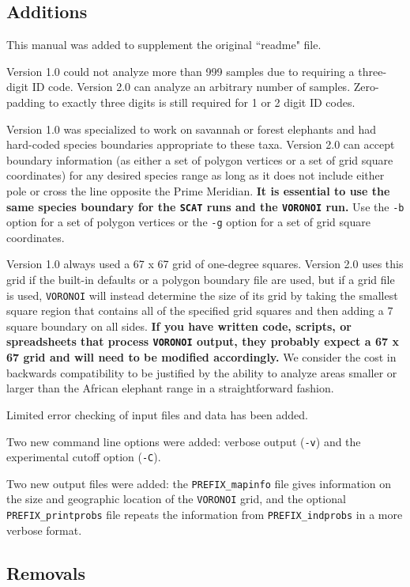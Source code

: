 \documentclass[10pt,titlepage,times,letterpaper]{article}
\def\SCAT{{\tt SCAT} }
\def\VORONOI{{\tt VORONOI} }
\begin{document}
\subsection{Additions}

This manual was added to supplement the original ``readme" file.

Version 1.0 could not analyze more than 999 samples due to requiring a three-digit
ID code.  Version 2.0 can analyze an arbitrary number of samples.  Zero-padding 
to exactly three digits is still required for 1 or 2 digit ID codes.

Version 1.0 was specialized to work on savannah or forest elephants and had hard-coded
species boundaries appropriate to these taxa.  Version 2.0 can accept boundary information
(as either a set of polygon vertices or a set of grid square coordinates) for
any desired species range as long as it does not include either pole or cross the line
opposite the Prime Meridian.
{\bf It is essential to use the same species boundary for the \SCAT runs and the \VORONOI run.}
Use the {\tt -b} option for a set of polygon vertices or the {\tt -g} option for
a set of grid square coordinates.

Version 1.0 always used a 67 x 67 grid of one-degree squares.  Version 2.0 uses this
grid if the built-in defaults or a polygon boundary file are used, but if a grid file is used,
\VORONOI will instead determine the size of its grid by taking the smallest square region 
that contains all of the specified grid squares and then adding a 7 square boundary on all 
sides.  
{\bf If you have written code, scripts, or spreadsheets that process \VORONOI output, they
probably expect a 67 x 67 grid and will need to be modified accordingly.}  We consider
the cost in backwards compatibility to be justified by the ability to analyze areas 
smaller or larger than the African elephant range in a straightforward fashion.

Limited error checking of input files and data has been added.

Two new command line options were added:  verbose output ({\tt -v}) and the experimental cutoff 
option ({\tt -C}). 

Two new output files were added:  the {\tt PREFIX\_mapinfo} file gives information on the
size and geographic location of the \VORONOI grid, and the optional {\tt PREFIX\_printprobs}
file repeats the information from {\tt PREFIX\_indprobs} in a more verbose format.

\subsection{Removals}
\end{document}
